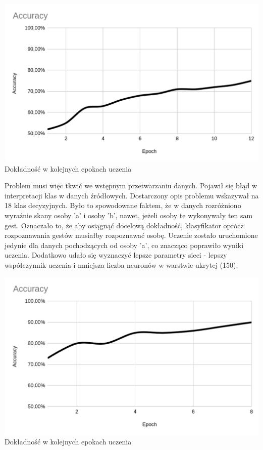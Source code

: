 \documentclass[a4paper,12pt]{article}
\begin{document}
\begin{center}
	\includegraphics[scale=0.25]{accuracy1.png}
	\\\small Dokładność w kolejnych epokach uczenia
\end{center}

\hspace{1cm}Problem musi więc tkwić we wstępnym przetwarzaniu danych. Pojawił się błąd w interpretacji klas w danych źródłowych. Dostarczony opis problemu wskazywał na 18 klas decyzyjnych. Było to spowodowane faktem, że w danych rozróżniono wyraźnie skany osoby 'a' i osoby 'b', nawet, jeżeli osoby te wykonywały ten sam gest. Oznaczało to, że aby osiągnąć docelową dokładność, klasyfikator oprócz rozpoznawania gestów musiałby rozpoznawać osobę. Uczenie zostało uruchomione jedynie dla danych pochodzących od osoby 'a', co znacząco poprawiło wyniki uczenia. Dodatkowo udało się wyznaczyć lepsze parametry sieci - lepszy współczynnik uczenia i mniejsza liczba neuronów w warstwie ukrytej (150).

\begin{center}
	\includegraphics[scale=0.25]{accuracy2.png}
	\\\small Dokładność w kolejnych epokach uczenia
\end{center}
\end{document}
